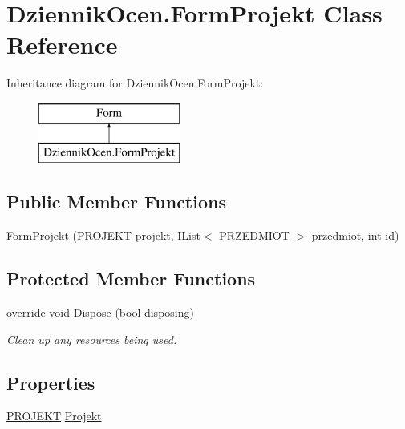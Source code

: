 \hypertarget{class_dziennik_ocen_1_1_form_projekt}{}\section{Dziennik\+Ocen.\+Form\+Projekt Class Reference}
\label{class_dziennik_ocen_1_1_form_projekt}
Inheritance diagram for Dziennik\+Ocen.\+Form\+Projekt\+:\begin{figure}[H]
\begin{center}
\leavevmode
\includegraphics[height=2.000000cm]{class_dziennik_ocen_1_1_form_projekt}
\end{center}
\end{figure}
\subsection*{Public Member Functions}
\begin{DoxyCompactItemize}
\item 
\hyperlink{class_dziennik_ocen_1_1_form_projekt_a8be8499fb861f2375950c4e61e7dcc8a}{Form\+Projekt} (\hyperlink{class_dziennik_ocen_1_1_p_r_o_j_e_k_t}{P\+R\+O\+J\+E\+KT} \hyperlink{class_dziennik_ocen_1_1_form_projekt_a67e21510e269671aa133417cb9b111b5}{projekt}, I\+List$<$ \hyperlink{class_dziennik_ocen_1_1_p_r_z_e_d_m_i_o_t}{P\+R\+Z\+E\+D\+M\+I\+OT} $>$ przedmiot, int id)
\end{DoxyCompactItemize}
\subsection*{Protected Member Functions}
\begin{DoxyCompactItemize}
\item 
override void \hyperlink{class_dziennik_ocen_1_1_form_projekt_a78ce43373f97d5189228be2bd0a986db}{Dispose} (bool disposing)
\begin{DoxyCompactList}\small\item\em Clean up any resources being used. \end{DoxyCompactList}\end{DoxyCompactItemize}
\subsection*{Properties}
\begin{DoxyCompactItemize}
\item 
\hyperlink{class_dziennik_ocen_1_1_p_r_o_j_e_k_t}{P\+R\+O\+J\+E\+KT} \hyperlink{class_dziennik_ocen_1_1_form_projekt_a3fa55e05e8e5a170bb01eb7a0682a342}{Projekt}
\end{DoxyCompactItemize}

